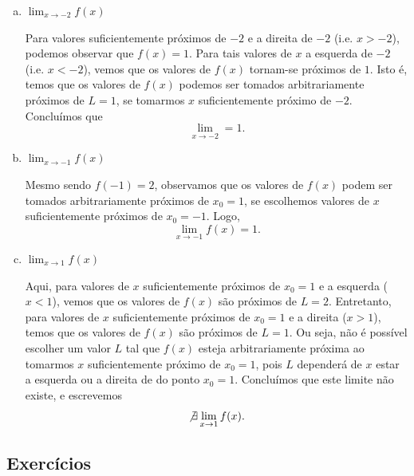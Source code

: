 \begin{resol}
  \begin{enumerate}[a)]
  \item $\displaystyle \lim_{x\to -2} f(x)$

    Para valores suficientemente próximos de $-2$ e a direita de $-2$ (i.e. $x>-2$), podemos observar que $f(x)=1$. Para tais valores de $x$ a esquerda de $-2$ (i.e. $x<-2$), vemos que os valores de $f(x)$ tornam-se próximos de $1$. Isto é, temos que os valores de $f(x)$ podemos ser tomados arbitrariamente próximos de $L=1$, se tomarmos $x$ suficientemente próximo de $-2$. Concluímos que
    \begin{equation}
      \lim_{x\to -2} = 1.
    \end{equation}

  \item $\displaystyle \lim_{x\to -1} f(x)$

    Mesmo sendo $f(-1)=2$, observamos que os valores de $f(x)$ podem ser tomados arbitrariamente próximos de $x_0=1$, se escolhemos valores de $x$ suficientemente próximos de $x_0=-1$. Logo,
    \begin{equation}
      \lim_{x\to -1} f(x) = 1.
    \end{equation}

    \item $\displaystyle \lim_{x\to 1} f(x)$

      Aqui, para valores de $x$ suficientemente próximos de $x_0=1$ e a esquerda ($x<1$), vemos que os valores de $f(x)$ são próximos de $L=2$. Entretanto, para valores de $x$ suficientemente próximos de $x_0=1$ e a direita ($x>1$), temos que os valores de $f(x)$ são próximos de $L=1$. Ou seja, não é possível escolher um valor $L$ tal que $f(x)$ esteja arbitrariamente próxima ao tomarmos $x$ suficientemente próximo de $x_0=1$, pois $L$ dependerá de $x$ estar a esquerda ou a direita de do ponto $x_0 = 1$. Concluímos que este limite não existe, e escrevemos
      \begin{equation}
        \not\exists\lim_{x\to 1} f(x).
      \end{equation}
  \end{enumerate}
\end{resol}

\subsection*{Exercícios}

